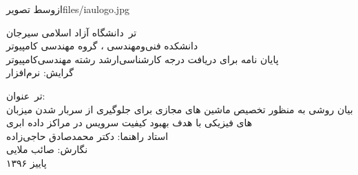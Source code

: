 ‌ازوسط
‌تصویر{files/iaulogo.jpg}


‌تر{\
	دانشگاه آزاد اسلامی سیرجان\\
دانشکده فنی‌ومهندسی ، گروه مهندسی کامپیوتر  \\
پایان نامه برای دریافت درجه کارشناسی‌ارشد رشته مهندسی‌کامپیوتر\
\\
گرایش: نرم‌افزار }


‌تر{\
	عنوان:\\
	بیان روشی به منظور تخصیص ماشین های مجازی برای جلوگیری از سربار شدن میزبان های فیزیکی با هدف بهبود کیفیت سرویس در مراکز داده ابری \\
	استاد راهنما: دکتر محمدصادق حاجی‌زاده \\
	نگارش: صائب ملایی \\
	پاییز   ۱۳۹۶
}

